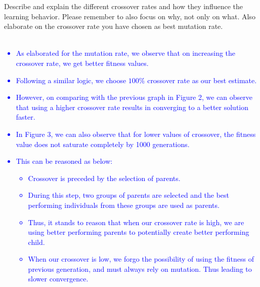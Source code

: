 \documentclass[a4paper, 12pt]{article}
\begin{document}
Describe and explain the different crossover rates and how they influence the learning behavior. Please remember to also focus on why, not only on what.
Also elaborate on the crossover rate you have chosen as best mutation rate.
\\ \\
\textcolor{blue}{
	\begin{itemize}
		\item As elaborated for the mutation rate, we observe that on increasing the crossover rate, we get better fitness values.
		\item Following a similar logic, we choose $100\%$ crossover rate as our best estimate.
		\item However, on comparing with the previous graph in Figure 2, we can observe that using a higher crossover rate results in converging to a better solution faster. 
		\item In Figure 3, we can also observe that for lower values of crossover, the fitness value does not saturate completely by 1000 generations.
		\item This can be reasoned as below:
			\begin{itemize}
				\item Crossover is preceded by the selection of parents.
				\item During this step, two groups of parents are selected and the best performing individuals from these groups are used as parents.
				\item Thus, it stands to reason that when our crossover rate is high, we are using better performing parents to potentially create better performing child.
				\item When our crossover is low, we forgo the possibility of using the fitness of previous generation, and must always rely on mutation. Thus leading to slower convergence.				
			\end{itemize}
	\end{itemize}
}
\end{document}
